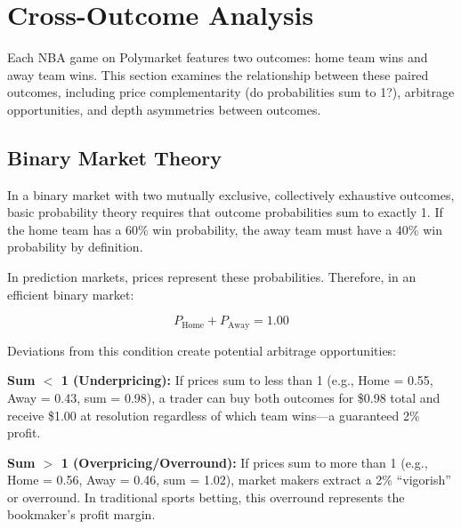 
\chapter{Cross-Outcome Analysis}
\label{sec:cross-outcome}

Each NBA game on Polymarket features two outcomes: home team wins and away team wins. This section examines the relationship between these paired outcomes, including price complementarity (do probabilities sum to 1?), arbitrage opportunities, and depth asymmetries between outcomes.

\section{Binary Market Theory}

In a binary market with two mutually exclusive, collectively exhaustive outcomes, basic probability theory requires that outcome probabilities sum to exactly 1. If the home team has a 60\% win probability, the away team must have a 40\% win probability by definition.

In prediction markets, prices represent these probabilities. Therefore, in an efficient binary market:

\begin{equation}
P_{\text{Home}} + P_{\text{Away}} = 1.00
\end{equation}

Deviations from this condition create potential arbitrage opportunities:

\textbf{Sum $<$ 1 (Underpricing):} If prices sum to less than 1 (e.g., Home = 0.55, Away = 0.43, sum = 0.98), a trader can buy both outcomes for \$0.98 total and receive \$1.00 at resolution regardless of which team wins---a guaranteed 2\% profit.

\textbf{Sum $>$ 1 (Overpricing/Overround):} If prices sum to more than 1 (e.g., Home = 0.56, Away = 0.46, sum = 1.02), market makers extract a 2\% ``vigorish'' or overround. In traditional sports betting, this overround represents the bookmaker's profit margin.

